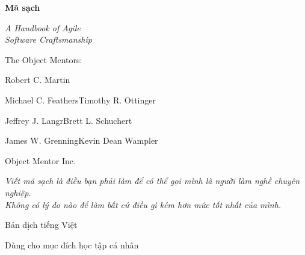 \documentclass[10pt,twoside,openright]{book}
\begin{document}
\frontmatter
\pagestyle{main}

\begin{titlepage}
\thispagestyle{empty}
\centering
\vspace*{58pt}
{\fontsize{34}{40}\selectfont\bfseries Mã sạch\par}
\vspace{16pt}
{\fontsize{17}{22}\selectfont\itshape A Handbook of Agile\\
Software Craftsmanship\par}
\vspace{54pt}
{\fontsize{12}{15}\selectfont The Object Mentors:\par}
\vspace{6pt}
{\fontsize{10}{13}\selectfont
Robert C. Martin\par
Michael C. Feathers\quad Timothy R. Ottinger\par
Jeffrey J. Langr\quad Brett L. Schuchert\par
James W. Grenning\quad Kevin Dean Wampler\par
Object Mentor Inc.\par}
\vfill
{\fontsize{9.5}{13}\selectfont\itshape
Viết mã sạch là điều bạn phải làm để có thể gọi mình là người làm nghề chuyên nghiệp.\\
Không có lý do nào để làm bất cứ điều gì kém hơn mức tốt nhất của mình.\par}
\vspace{40pt}
{\fontsize{10}{13}\selectfont Bản dịch tiếng Việt\par}
\vspace{6pt}
{\fontsize{9}{11}\selectfont Dùng cho mục đích học tập cá nhân\par}
\vspace{14pt}
\end{titlepage}
\end{document}

